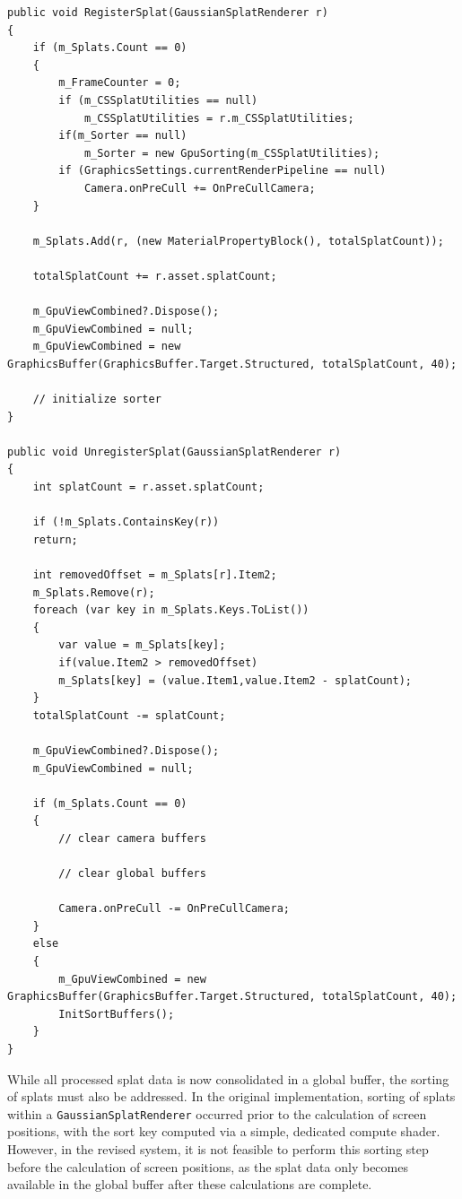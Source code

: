 \documentclass[12pt]{article}
\begin{document}
\begin{lstlisting}[tabsize=2,caption=New RegisterSplat and UnregisterSplat, label=code:sort_ratio,breaklines=true,breakatwhitespace=true,basicstyle=\ttfamily\footnotesize]
public void RegisterSplat(GaussianSplatRenderer r)
{
	if (m_Splats.Count == 0)
	{
		m_FrameCounter = 0;
		if (m_CSSplatUtilities == null)
			m_CSSplatUtilities = r.m_CSSplatUtilities;
		if(m_Sorter == null)
			m_Sorter = new GpuSorting(m_CSSplatUtilities);
		if (GraphicsSettings.currentRenderPipeline == null)
			Camera.onPreCull += OnPreCullCamera;
	}
	
	m_Splats.Add(r, (new MaterialPropertyBlock(), totalSplatCount));
	
	totalSplatCount += r.asset.splatCount;
	
	m_GpuViewCombined?.Dispose();
	m_GpuViewCombined = null;
	m_GpuViewCombined = new GraphicsBuffer(GraphicsBuffer.Target.Structured, totalSplatCount, 40);
	
	// initialize sorter
}

public void UnregisterSplat(GaussianSplatRenderer r)
{
	int splatCount = r.asset.splatCount;

	if (!m_Splats.ContainsKey(r))
	return;
	
	int removedOffset = m_Splats[r].Item2;
	m_Splats.Remove(r);
	foreach (var key in m_Splats.Keys.ToList())
	{
		var value = m_Splats[key];
		if(value.Item2 > removedOffset)
		m_Splats[key] = (value.Item1,value.Item2 - splatCount);
	}
	totalSplatCount -= splatCount;
	
	m_GpuViewCombined?.Dispose();
	m_GpuViewCombined = null;
	
	if (m_Splats.Count == 0)
	{
		// clear camera buffers
		
		// clear global buffers
		
		Camera.onPreCull -= OnPreCullCamera;
	}
	else
	{
		m_GpuViewCombined = new GraphicsBuffer(GraphicsBuffer.Target.Structured, totalSplatCount, 40);
		InitSortBuffers();
	}
}
\end{lstlisting}
While all processed splat data is now consolidated in a global buffer, the sorting of splats must also be addressed. In the original implementation, sorting of splats within a \texttt{GaussianSplatRenderer} occurred prior to the calculation of screen positions, with the sort key computed via a simple, dedicated compute shader. However, in the revised system, it is not feasible to perform this sorting step before the calculation of screen positions, as the splat data only becomes available in the global buffer after these calculations are complete.\\
\end{document}
